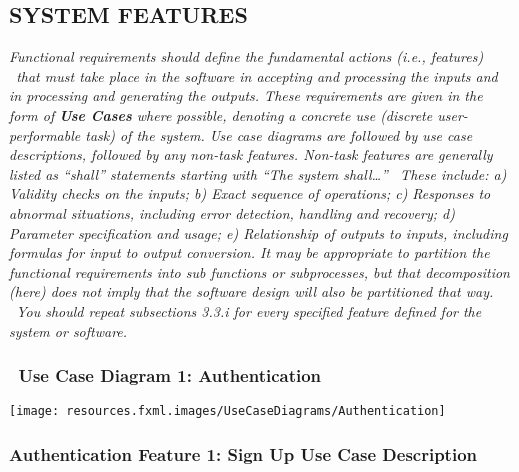 \documentclass[twoside,letterpaper]{article}
\begin{document}
\subsection[SYSTEM FEATURES]{\rmfamily\bfseries\color{black} SYSTEM FEATURES}
\hypertarget{RefHeading21659017292}{}{\itshape\color{black}
Functional requirements should define the fundamental actions (i.e., features) \ that must take place in the software in
accepting and processing the inputs and in processing and generating the outputs. These requirements are given in the
form of \textbf{Use Cases} where possible, denoting a concrete use (discrete user-performable task) of the system. Use
case diagrams are followed by use case descriptions, followed by any non-task features. Non-task features are generally
listed as ``shall'' statements starting with ``The system shall{\dots}'' \ These include: a) Validity checks on the
inputs; b) Exact sequence of operations; c) Responses to abnormal situations, including error detection, handling and
recovery; d) Parameter specification and usage; e) Relationship of outputs to inputs, including formulas for input to
output conversion. \newline
\newline
It may be appropriate to partition the functional requirements into sub functions or subprocesses, but that
decomposition (here) does not imply that the software design will also be partitioned that way. \ You should repeat
subsections 3.3.i for every specified feature defined for the system or software.}

\subsubsection[Use Case Diagram 1: Authentication]{\foreignlanguage{english}{\ Use Case Diagram 1: Authentication}}
\label{a:ucd}
\hypertarget{RefHeading21859017292}{}{\color{black}
}

\texttt{[image: resources.fxml.images/UseCaseDiagrams/Authentication]}
\newpage

\subsubsection[Authentication Feature 1: Sign Up Use Case Description]{\rmfamily\bfseries\color{black}
Authentication Feature 1: Sign Up Use Case Description}
\hypertarget{RefHeading22059017292}{}
\label{a:uc1}
\end{document}
